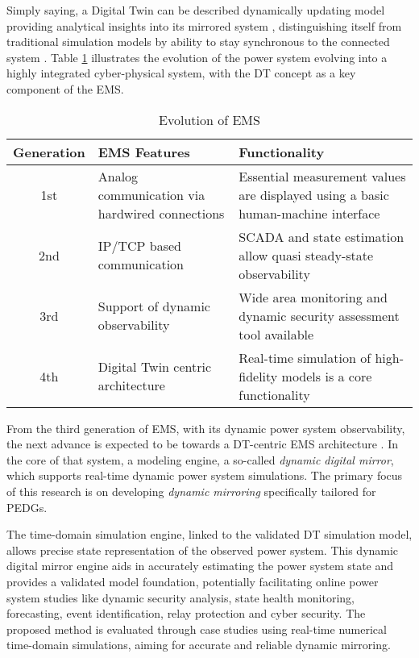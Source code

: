 
Simply saying, a Digital Twin can be described dynamically updating model providing analytical insights into its mirrored system , distinguishing itself from traditional simulation models by ability to stay synchronous to the connected system \autocite{Zomerdijk_2024}. Table \ref{tab:ems_evol} illustrates the evolution of the power system evolving into a highly integrated cyber-physical system, with the DT concept as a key component of the EMS.

\begin{table} [htbp]
    \centering
    \begin{threeparttable}%
        \caption{Evolution of EMS \autocite{8398846}}\label{tab:ems_evol}%
        \begin{tabular}{| c || p{5cm} | p{8cm} |}
            \hline
            \hline
                 \textbf{Generation} & \textbf{EMS Features} & \textbf{Functionality}\\ \hline
                1st & Analog communication via hardwired connections & Essential measurement values are displayed using a basic human-machine interface \\ \hline
                2nd & IP/TCP based  communication & SCADA and state estimation allow quasi steady-state observability \\ \hline
                3rd & Support of dynamic  observability & Wide area monitoring and dynamic security assessment tool available \\ \hline
                4th & Digital Twin centric architecture & Real-time simulation of high-fidelity models is a core functionality \\ \hline
            \hline
        \end{tabular}
    \end{threeparttable}
\end{table}

From the third generation of EMS, with its dynamic power system observability, the next advance is expected to be towards a DT-centric EMS architecture \autocite{dbt_mods_00054812}. In the core of that system, a modeling engine, a so-called \textit{dynamic digital mirror}, which supports real-time dynamic power system simulations. The primary focus of this research is on developing \textit{dynamic mirroring} specifically tailored for PEDGs.

The time-domain simulation engine, linked to the validated DT simulation model, allows precise state representation of the observed power system. This dynamic digital mirror engine aids in accurately estimating the power system state and provides a validated model foundation, potentially facilitating online power system studies like dynamic security analysis, state health monitoring, forecasting, event identification, relay protection and cyber security. The proposed method is evaluated through case studies using real-time numerical time-domain simulations, aiming for accurate and reliable dynamic mirroring.




